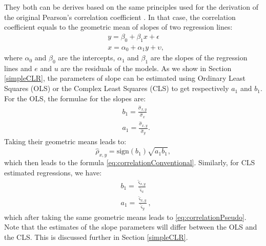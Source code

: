 \documentclass[
]{book}
\begin{document}
They both can be derives based on the same principles used for the derivation of the original Pearson's correlation coefficient \citep{refPearson}. In that case, the correlation coefficient equals to the geometric mean of slopes of two regression lines:
\begin{equation}
    \begin{aligned}
        &y = \beta_0 + \beta_1 x + \epsilon \\
        &x = \alpha_0 + \alpha_1 y + \upsilon ,
    \end{aligned}
    \label{eq:twoRegressions}
\end{equation}
where \(\alpha_0\) and \(\beta_0\) are the intercepts, \(\alpha_1\) and \(\beta_1\) are the slopes of the regression lines and \(e\) and \(u\) are the residuals of the models. As we show in Section \ref{simpleCLR}, the parameters of slope can be estimated using Ordinary Least Squares (OLS) or the Complex Least Squares (CLS) to get respectively \(a_1\) and \(b_1\). For the OLS, the formulae for the slopes are:
\begin{equation}
    \begin{aligned}
        &b_1 = \frac{\hat{\sigma}_{x,y}}{\hat{\sigma}_x} \\
        &a_1 = \frac{\hat{\sigma}_{x,y}}{\hat{\sigma}_y} .
    \end{aligned}
    \label{eq:twoRegressionsOLS}
\end{equation}
Taking their geometric means leads to:
\begin{equation}
    \hat{\rho}_{x,y} = \mathrm{sign}(b_1) \sqrt{a_1 b_1},
    \label{eq:correlationConventionalEstimate}
\end{equation}
which then leads to the formula \eqref{eq:correlationConventional}. Similarly, for CLS estimated regressions, we have:
\begin{equation}
    \begin{aligned}
        &b_1 = \frac{\hat{\varsigma}_{x,y}}{\hat{\varsigma}_x} \\
        &a_1 = \frac{\hat{\varsigma}_{x,y}}{\hat{\varsigma}_y} ,
    \end{aligned}
    \label{eq:twoRegressionsCLS}
\end{equation}
which after taking the same geometric means leads to \eqref{eq:correlationPseudo}. Note that the estimates of the slope parameters will differ between the OLS and the CLS. This is discussed further in Section \ref{simpleCLR}.
\end{document}
